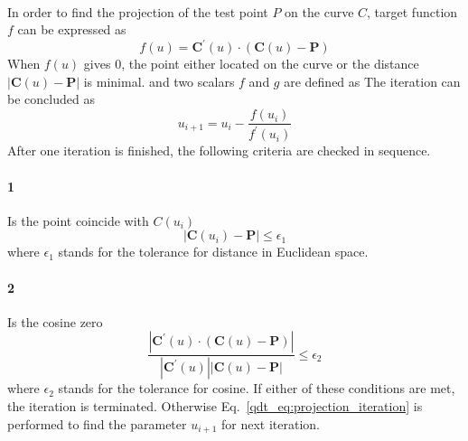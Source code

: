 \paragraph{}
In order to find the projection of the test point $P$ on the curve $C$, target function $f$ can be expressed as
\begin{equation}
    f(u) = \mathbf{C}^\prime (u) \cdot (\mathbf{C}(u) - \mathbf{P})
\end{equation}
%
When $f(u)$ gives $0$, the point either located on the curve or the distance $|\mathbf{C}(u) - \mathbf{P}|$ is minimal.
and two scalars $f$ and $g$ are defined as
%
The iteration can be concluded as
\begin{equation}
    u_{i+1} = u_i -
    \frac{ f(u_i) }{ f^\prime(u_i) }
\label{qdt_eq:projection_iteration}
\end{equation}
After one iteration is finished, the following criteria are checked in sequence.
\paragraph{1}
Is the point coincide with $C(u_i)$
\begin{equation*}
    |\mathbf{C} (u_i) - \mathbf{P}| \leq \epsilon_1
\end{equation*}
%
where $\epsilon_1$ stands for the tolerance for distance in Euclidean space.
\paragraph{2}
Is the cosine zero
\begin{equation*}
    \frac{
        |\mathbf{C}^\prime (u) \cdot (\mathbf{C}(u) - \mathbf{P})|
    }{
        |\mathbf{C}^\prime (u)|
        |\mathbf{C}(u) - \mathbf{P}|
    } \leq \epsilon_2
\end{equation*}
%
where $\epsilon_2$ stands for the tolerance for cosine.
If either of these conditions are met, the iteration is terminated.
Otherwise Eq.~\ref{qdt_eq:projection_iteration} is performed to find the parameter $u_{i+1}$ for next iteration.
